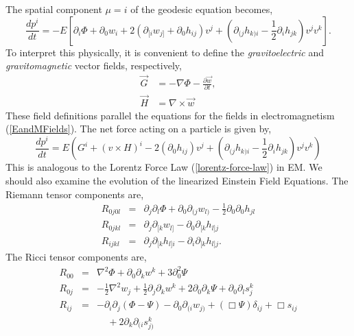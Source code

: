 The spatial component $\mu=i$ of the geodesic equation becomes,
\begin{equation}\nonumber
    \frac{dp^i}{dt} = -E\left[\partial_i\Phi + \partial_0 w_i + 2\left(\partial_{[i}w_{j]} + \partial_0h_{ij}\right)v^j+ \left(\partial_{(j}h_{k)i} - \frac{1}{2}\partial_{i}h_{jk}\right)v^jv^k\right].
\end{equation}
To interpret this physically, it is convenient to define the \textit{gravitoelectric} and \textit{gravitomagnetic} vector fields, respectively,
\begin{equation}
\begin{split}
    \vec{G} &= -\nabla\Phi -\frac{\partial\vec{w}}{\partial t},\\
    \vec{H} &= \nabla\times \vec{w}
\end{split}
\end{equation}
These field definitions parallel the equations for the fields in electromagnetism (\ref{EandMFields}). The net force acting on a particle is given by,
\begin{equation}
    \frac{dp^i}{d t} =  E\left(G^i + (v\times H)^i - 2(\partial_0h_{ij})v^j+ \left(\partial_{(j}h_{k)i} - \frac{1}{2}\partial_{i}h_{jk}\right)v^jv^k\right)
\end{equation}
This is analogous to the Lorentz Force Law (\ref{lorentz-force-law}) in EM. 
We should also examine the evolution of the linearized Einstein Field Equations. The Riemann tensor components are,
\begin{eqnarray*}
    R_{0j0l} &=& \partial_j\partial_l\Phi + \partial_0\partial_{(j}w_{l)} -\frac{1}{2}\partial_0\partial_0h_{jl}\\
    R_{0jkl} &=& \partial_{j}\partial_{[k}w_{l]} - \partial_0\partial_{[k}h_{l]j}\\
    R_{ijkl} &=& \partial_j\partial_{[k}h_{l]i} - \partial_i\partial_{[k}h_{l]j}.
\end{eqnarray*}
The Ricci tensor components are,
\begin{eqnarray*}
    R_{00} &=& \nabla^2\Phi + \partial_0\partial_kw^k + 3\partial_0^2\Psi\\
    R_{0j} &=& -\frac{1}{2}\nabla^2w_j + \frac{1}{2}\partial_j\partial_kw^k + 2\partial_{0}\partial_k\Psi + \partial_0\partial_ls_{j}^k\\
    R_{ij} &=& -\partial_i\partial_j(\Phi - \Psi) - \partial_0\partial_{(i}w_{j)} + (\Box\Psi)\delta_{ij} + \Box s_{ij} \\
    &\ &\ \ \ \ \ + 2\partial_{k}\partial_{(i}s_{j)}^k
\end{eqnarray*}
